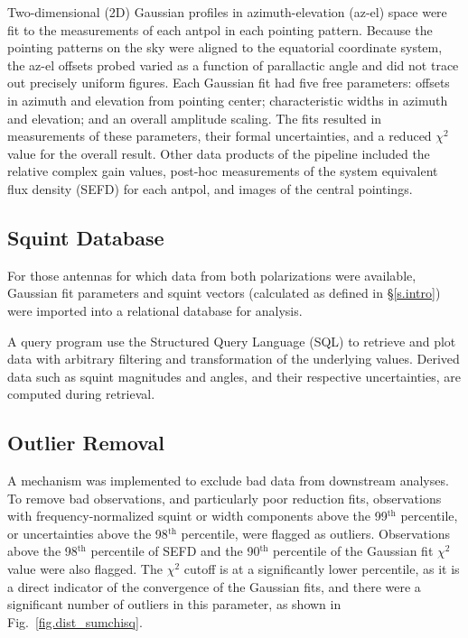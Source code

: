 \documentclass[preprint]{aastex}
\begin{document}
Two-dimensional (2D) Gaussian profiles in azimuth-elevation (az-el)
space were fit to the measurements of each antpol in each pointing
pattern. Because the pointing patterns on the sky were aligned to the
equatorial coordinate system, the az-el offsets probed varied as a
function of parallactic angle and did not trace out precisely uniform
figures. Each Gaussian fit had five free parameters: offsets in
azimuth and elevation from pointing center; characteristic widths in
azimuth and elevation; and an overall amplitude scaling. The fits
resulted in measurements of these parameters, their formal
uncertainties, and a reduced $\chi^2$ value for the overall
result. Other data products of the pipeline included the relative
complex gain values, post-hoc measurements of the system equivalent
flux density (SEFD) for each antpol, and images of the central
pointings.

\subsection{Squint Database}\label{ss.database}
For those antennas for which data from both polarizations were available, 
Gaussian fit parameters and squint vectors (calculated as defined in 
\S\ref{s.intro}) were imported into a relational database for analysis.

A query program use the Structured Query Language (SQL) to retrieve
and plot data with arbitrary filtering and transformation of the
underlying values. Derived data such as squint magnitudes and angles,
and their respective uncertainties, are computed during retrieval.

\subsection{Outlier Removal}\label{ss.outliers}
A mechanism was implemented to exclude bad data from downstream
analyses.  To remove bad observations, and particularly poor reduction
fits, observations with frequency-normalized squint or width
components above the 99$^\textrm{th}$ percentile, or uncertainties above the
98$^\textrm{th}$ percentile, were flagged as outliers.  Observations
above the 98$^\textrm{th}$ percentile of SEFD and the 90$^\textrm{th}$
percentile of the Gaussian fit $\chi^2$ value were also flagged.  The
$\chi^2$ cutoff is at a significantly lower percentile, as it is a
direct indicator of the convergence of the Gaussian fits, and there
were a significant number of outliers in this parameter, as shown in
Fig.~\ref{fig.dist_sumchisq}.
\end{document}
